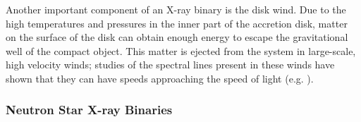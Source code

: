 \par Another important component of an X-ray binary is the disk wind.  Due to the high temperatures and pressures in the inner part of the accretion disk, matter on the surface of the disk can obtain enough energy to escape the gravitational well of the compact object.  This matter is ejected from the system in large-scale, high velocity winds; studies of the spectral lines present in these winds have shown that they can have speeds approaching the speed of light (e.g. \citealp{Degenaar_BPSpec}).

\subsubsection{Neutron Star X-ray Binaries}

\label{sec:NSintro}

